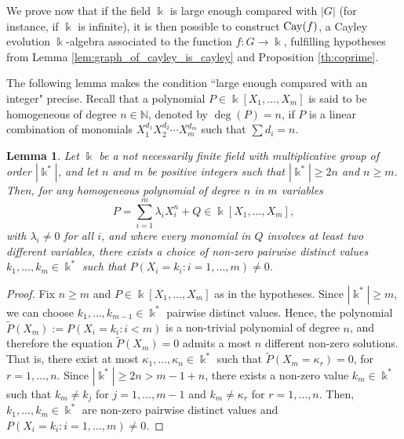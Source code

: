 \documentclass[a4paper,12pt]{amsart}
\newtheorem{lemma}[theorem]{Lemma}
\theoremstyle{definition}
\theoremstyle{remark}
\newtheorem{remark}[theorem]{Remark}
\newcommand{\Cay}{{\rm Cay}}
\begin{document}

We prove now that if the field $\Bbbk$ is large enough compared with $|G|$ (for instance, if $\Bbbk$ is infinite),  it is then possible to construct $\Cay(f)$, a Cayley evolution $\Bbbk$-algebra associated to the function $f: G \to \Bbbk$, fulfilling  hypotheses from  Lemma \ref{lem:graph_of_cayley_is_cayley} and  Proposition \ref{th:coprime}.

The following lemma makes the condition ``large enough compared with an integer" precise. Recall that a polynomial $P\in \Bbbk[X_1,\ldots, X_m]$ is said to be homogeneous of degree $n\in\mathbb{N}$, denoted by $\deg(P)=n$, if $P$ is a linear combination of monomials $X_1^{d_1}X_2^{d_2}\cdots X_m^{d_m}$ such that $\sum d_i=n$.

\begin{lemma}\label{lem:large_enough}
Let $\Bbbk$ be a not necessarily finite field with multiplicative group of order $|\Bbbk^*|$, and let $n$ and $m$ be  positive  integers such that $|\Bbbk^*|\geq 2n$ and $n \geq m$. Then, for any homogeneous polynomial of degree $n$ in $m$ variables
$$P=\sum_{i=1}^m \lambda_iX_i^n + Q\in\Bbbk[X_1,\ldots, X_m],$$ with $\lambda_i \neq 0$ for all $i$, and where every monomial in $Q$ involves at least two different variables,  there exists a choice of non-zero pairwise distinct values $k_1,\ldots, k_m\in\Bbbk^*$  such that $P(X_i=k_i: i=1,\ldots, m)\ne 0$.
\end{lemma}
\begin{proof}
Fix $n \geq m$ and $P\in\Bbbk[X_1,\ldots, X_m]$ as in the hypotheses. Since  $|\Bbbk^*| \geq m$,  we can choose $k_1,\ldots, k_{m-1}\in\Bbbk^*$ pairwise distinct values.  Hence, the polynomial $\widetilde{P}(X_m):=P(X_i=k_i: i<m)$ is a non-trivial polynomial of degree $n$, and therefore the equation $\widetilde{P}(X_m)=0$ admits a most $n$  different non-zero solutions. That is, there exist at most $\kappa_1,\ldots,\kappa_n\in\Bbbk^*$ such that  $\widetilde{P}(X_m=\kappa_r)=0$, for $r=1, \ldots, n$. Since $|\Bbbk^*|\geq 2n> m-1+n$, there exists a non-zero value $k_m\in\Bbbk^*$ such that $k_m\ne k_j$ for $j=1,\ldots,m-1$ and $k_m\ne \kappa_r$ for $r=1,\ldots, n$. Then, $k_1,\ldots, k_m\in\Bbbk^*$ are non-zero pairwise distinct values and $P(X_i=k_i: i=1,\ldots, m)\ne 0$.
\end{proof}
\end{document}
